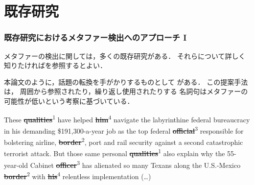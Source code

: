 \documentclass[11pt,usepdftitle=false]{beamer}
\newcommand\firstref[1]{\textcolor{sLightBlue}{\sout{\textbf{#1}}}\textsuperscript{1}}
\newcommand\secondref[1]{\textcolor{sPink}{\sout{\textbf{#1}}}\textsuperscript{2}}
\newcommand\thirdref[1]{\textcolor{sYellow}{\sout{\textbf{#1}}}\textsuperscript{3}}
\newcommand\fourthref[1]{\textcolor{sPurple}{\sout{\textbf{#1}}}\textsuperscript{4}}
\newcommand\stress[1]{\textcolor{sRed}{\textbf{#1}}}
\newcommand\papertitle[1]{\textit{#1}}
\let\oldcite=\citet
\renewcommand\citet[1]{\hyperlink{#1}{\oldcite{#1}}}
\begin{document}

\section{既存研究}
\begin{frame}
\frametitle{既存研究におけるメタファー検出へのアプローチ I}
    メタファーの検出に関しては，多くの既存研究がある．
    それらについて詳しく知りたければ\citet{veale2016}を参照するとよい．

    本論文のように，話題の転換を手がかりするものとして
    \citet{broadwell2013}がある．
    この提案手法は，
    周囲から参照されたり，繰り返し使用されたりする
    名詞句はメタファーの可能性が低いという考察に基づいている．

    \smallskip

    \begingroup
    \small
    \begin{leftbar}
        These \firstref{qualities}
        have helped \fourthref{him}
        navigate the labyrinthine federal bureaucracy in his demanding
        \$191,300-a-year job as the top federal \thirdref{official}
        responsible for bolstering airline, \secondref{border},
        port and rail security against a second catastrophic terrorist attack.
        But those same personal \firstref{qualities} also explain
        why the 55-year-old Cabinet \thirdref{officer} has alienated
        so many Texans along the U.S.-Mexico \secondref{border} with
        \fourthref{his} relentless implementation (…)
    \end{leftbar}
    \endgroup
\end{frame}
\end{document}
